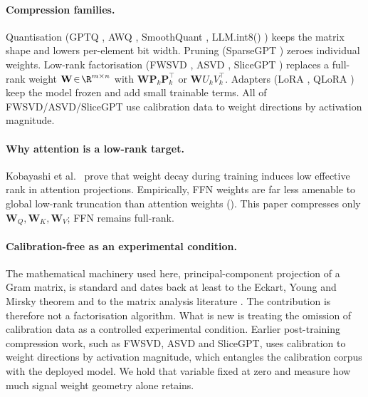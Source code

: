\documentclass[11pt]{article}
\providecommand{\Pmat}{\mathbf{P}}
\providecommand{\Wmat}{\mathbf{W}}
\begin{document}
\paragraph{Compression families.}
Quantisation (GPTQ \cite{frantar2022gptq}, AWQ \cite{lin2023awq},
SmoothQuant \cite{xiao2022smoothquant}, LLM.int8() \cite{dettmers2022llmint8})
keeps the matrix shape and lowers per-element bit width.  Pruning
(SparseGPT \cite{frantar2023sparsegpt}) zeroes individual weights.
Low-rank factorisation (FWSVD \cite{hsu2022fwsvd}, ASVD
\cite{yuan2023asvd}, SliceGPT \cite{ashkboos2024slicegpt}) replaces a
full-rank weight $\Wmat\!\in\!\R^{m\times n}$ with $\Wmat\Pmat_k\Pmat_k^\top$
or $\Wmat U_kV_k^\top$.  Adapters (LoRA \cite{hu2021lora},
QLoRA \cite{dettmers2023qlora}) keep the model frozen and add small
trainable terms.  All of FWSVD/ASVD/SliceGPT use calibration data to
weight directions by activation magnitude.

\paragraph{Why attention is a low-rank target.}
Kobayashi et al.\ \cite{kobayashi2024lowrankattn} prove that weight decay
during training induces low effective rank in attention projections.
Empirically, FFN weights are far less amenable to global low-rank truncation
than attention weights ().  This paper compresses only
$\Wmat_Q,\Wmat_K,\Wmat_V$; FFN remains full-rank.

\paragraph{Calibration-free as an experimental condition.}
The mathematical machinery used here, principal-component projection of a
Gram matrix, is standard and dates back at least to the
Eckart, Young and Mirsky theorem \cite{eckart1936} and to the matrix
analysis literature \cite{trefethen1997nla,golub2013matrix}. The
contribution is therefore not a factorisation algorithm. What is new is
treating the omission of calibration data as a controlled experimental
condition. Earlier post-training compression work, such as FWSVD, ASVD and
SliceGPT, uses calibration to weight directions by activation magnitude,
which entangles the calibration corpus with the deployed model. We hold
that variable fixed at zero and measure how much signal weight geometry
alone retains.
\end{document}
